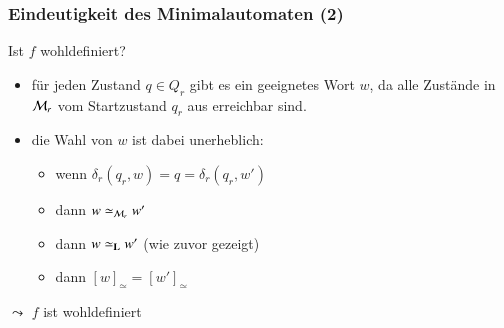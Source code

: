 \documentclass[aspectratio=1610,onlymath]{beamer}
\begin{document}
\begin{frame}[t]\frametitle{Eindeutigkeit des Minimalautomaten (2)}


%
\medskip

Ist $f$ wohldefiniert?\pause
\begin{itemize}
\item für jeden Zustand $q\in Q_r$ gibt es ein geeignetes Wort $w$, da alle Zustände in $\mathcal{M}_r$ vom
Startzustand $q_r$ aus erreichbar sind.\pause
\item die Wahl von $w$ ist dabei unerheblich: 
\begin{itemize}
\item wenn $\delta_r(q_r,w)=q=\delta_r(q_r,w')$ 
\item dann $w\simeq_{\mathcal{M}_r} w'$
\item dann $w\simeq_{\textbf{\textcolor{black}{L}}} w'$ (wie zuvor gezeigt)
\item dann $[w]_\simeq=[w']_\simeq$
\end{itemize}
\end{itemize}
\bigskip

$\leadsto$ $f$ ist wohldefiniert

\end{frame}
\end{document}
